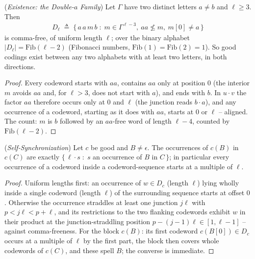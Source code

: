 \documentclass[runningheads,envcountsect]{llncs}
\begin{document}
\begin{lemma}
    (\emph{Existence: the Double-$a$ Family})
    \label{lem:dict}
    Let $\Gamma$ have two distinct letters $a \ne b$ and $\ell \geq 3$. Then
    \begin{align}
        D_\ell \;\triangleq\; \{\, a\,a\,m\,b \;:\; m \in \Gamma^{\ell-3},\ aa \not\le m,\ m[0] \ne a \,\}
    \end{align}
    is comma-free, of uniform length $\ell$; over the binary alphabet $|D_\ell| = \mathrm{Fib}(\ell-2)$ (Fibonacci numbers, $\mathrm{Fib}(1) = \mathrm{Fib}(2) = 1$). So good codings exist between any two alphabets with at least two letters, in both directions.
\end{lemma}

\begin{proof}
    Every codeword starts with $aa$, contains $aa$ only at position $0$ (the interior $m$ avoids $aa$ and, for $\ell > 3$, does not start with $a$), and ends with $b$. In $u \cdot v$ the factor $aa$ therefore occurs only at $0$ and $\ell$ (the junction reads $b \cdot a$), and any occurrence of a codeword, starting as it does with $aa$, starts at $0$ or $\ell$ -- aligned. The count: $m$ is $b$ followed by an $aa$-free word of length $\ell-4$, counted by $\mathrm{Fib}(\ell-2)$.
\end{proof}

\begin{lemma}
    (\emph{Self-Synchronization})
    \label{lem:selfsync}
    Let $c$ be good and $B \ne \epsilon$. The occurrences of $c(B)$ in $c(C)$ are exactly $\{\, \ell \cdot s \;:\; s$ an occurrence of $B$ in $C \,\}$; in particular every occurrence of a codeword inside a codeword-sequence starts at a multiple of $\ell$.
\end{lemma}

\begin{proof}
    Uniform lengths first: an occurrence of $w \in D_c$ (length $\ell$) lying wholly inside a single codeword (length $\ell$) of the surrounding sequence starts at offset $0$. Otherwise the occurrence straddles at least one junction $j\ell$ with $p < j\ell < p + \ell$, and its restrictions to the two flanking codewords exhibit $w$ in their product at the junction-straddling position $p - (j{-}1)\ell \in [1, \ell-1]$ -- against comma-freeness. For the block $c(B)$: its first codeword $c(B[0]) \in D_c$ occurs at a multiple of $\ell$ by the first part, the block then covers whole codewords of $c(C)$, and these spell $B$; the converse is immediate.
\end{proof}
\end{document}
